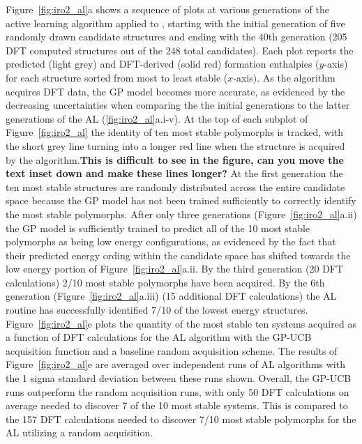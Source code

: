 %
Figure~\ref{fig:iro2_al}a shows a sequence of plots at various generations of the active learning algorithm applied to \IrOthree,
starting with the initial generation of five randomly drawn candidate structures and ending with the 40th generation
(\num{205} DFT computed structures out of the \num{248} total candidates).
%
Each plot reports the predicted (light grey) and DFT-derived (solid red) formation enthalpies ($y$-axis) for each structure sorted from most to least stable ($x$-axis).
%
As the algorithm acquires DFT data, the GP model becomes more accurate, as evidenced by the decreasing uncertainties when comparing the the initial generations to the latter generations of the AL (\ref{fig:iro2_al}a.i-v).
%
At the top of each subplot of Figure~\ref{fig:iro2_al} the identity of ten most stable polymorphs is tracked,
with the short grey line turning into a longer red line when the structure is acquired by the algorithm.\textbf{This is difficult to see in the figure, can you move the text inset down and make these lines longer?}
%
At the first generation the ten most stable structures are randomly distributed across the entire candidate space because the GP model has not been trained sufficiently to correctly identify the most stable polymorphs.
%
After only three generations (Figure~\ref{fig:iro2_al}a.ii) the GP model is sufficiently trained to predict all of the 10 most stable polymorphs as being low energy configurations, as evidenced by the fact that their predicted energy ording within the candidate space has shifted towards the low energy portion of Figure~\ref{fig:iro2_al}a.ii.
%
By the third generation (\num{20} DFT calculations) \num{2/10} most stable polymorphs have been acquired.
%
By the 6th generation (Figure~\ref{fig:iro2_al}a.iii) (\num{15} additional DFT calculations) the AL routine has successfully identified \num{7/10} of the lowest energy structures.
%
Figure~\ref{fig:iro2_al}e plots the quantity of the most stable ten systems acquired as a function of DFT calculations for the AL algorithm with the GP-UCB acquisition function and a baseline random acquisition scheme.
%
The results of Figure~\ref{fig:iro2_al}e are averaged over independent runs of AL algorithms with the 1 sigma standard deviation between these runs shown.
%
Overall, the GP-UCB runs outperform the random acquisition runs, with only \num{50} DFT calculations on average needed to discover \num{7} of the \num{10} most stable systems.
%
This is compared to the \num{157} DFT calculations needed to discover \num{7/10} most stable polymorphs for the AL utilizing a random acquisition.

